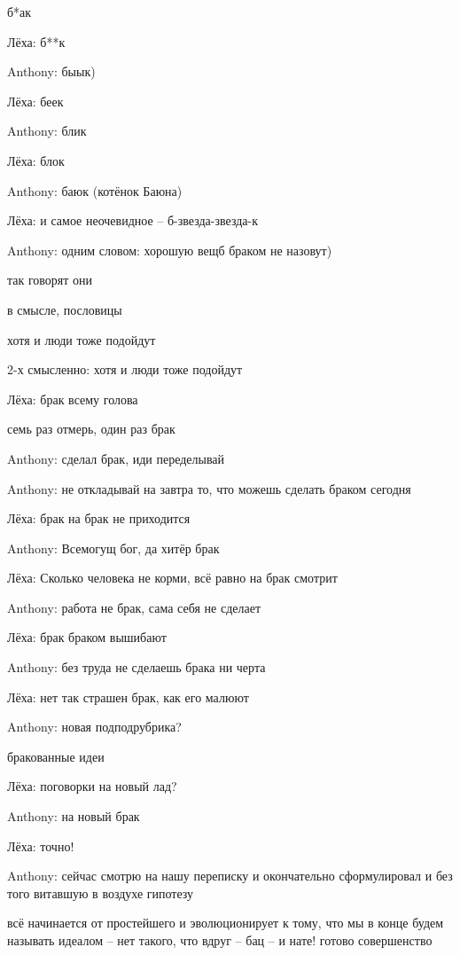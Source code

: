 \begin{flushleft}
\begin{miamalist}
  б*ак

  \item[Лёха:] б**к
  \item[Anthony:] быык)
  \item[Лёха:] беек
  \item[Anthony:] блик
  \item[Лёха:] блок
  \item[Anthony:] баюк (котёнок Баюна)
  \item[Лёха:] и самое неочевидное -- б-звезда-звезда-к
  \item[Anthony:] одним словом: хорошую вещб браком не назовут)
  
  так говорят они
  
  в смысле, пословицы
  
  хотя и люди тоже подойдут
  
  2-х смысленно: хотя и люди тоже подойдут
  \item[Лёха:] брак всему голова
  
  семь раз отмерь, один раз брак
  \item[Anthony:] сделал брак, иди переделывай
  \item[Anthony:] не откладывай на завтра то, что можешь сделать браком сегодня
  \item[Лёха:] брак на брак не приходится
  \item[Anthony:] Всемогущ бог, да хитёр брак
  \item[Лёха:] Сколько человека не корми, всё равно на брак смотрит
  \item[Anthony:] работа не брак, сама себя не сделает
  \item[Лёха:] брак браком вышибают
  \item[Anthony:] без труда не сделаешь брака ни черта
  \item[Лёха:] нет так страшен брак, как его малюют
  \item[Anthony:] новая подподрубрика?
  
  бракованные идеи
  \item[Лёха:] поговорки на новый лад?
  \item[Anthony:] на новый брак
  \item[Лёха:] точно!
  \item[Anthony:] сейчас смотрю на нашу переписку и окончательно сформулировал и без того витавшую в воздухе гипотезу
  
  всё начинается от простейшего и эволюционирует к тому, что мы в конце будем называть идеалом -- нет такого, что вдруг -- бац -- и нате! готово совершенство
  

\end{miamalist}
\end{flushleft}
